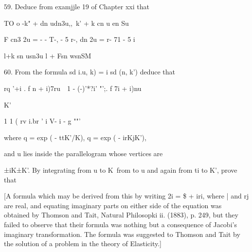 
59. Deduce from examjjle 19 of Chapter xxi that

TO o -k" + dn udn3u,,\ k' + k cn u en Su

F cn3 2u = - - T-, - 5 r-, dn 2u = r- 71 - 5 i~ 

l+k sn usn3u l + Fsn wsnSM


60. From the formula sd i.u, k) = i sd (n, k') deduce that

rq '+i . f n + i)7ru\ \ 1 - (-)'*?i' "';. f 7i + i)nu

K'

1 1 ( rv i.br ' i V- i - g ""'

where q = exp ( - ttK'/K), q = exp ( - irKjK'),

and u lies inside the parallelogram whose vertices are

±iK±K'. By integrating from u to K\ from to u and again from ti to K',
prove that

[A formula which may be derived from this by writing 2i = \$ + iri,
where | and rj are real, and equating imaginary parts on either side
of the equation was obtained by Thomson and Tait, Natural Philosopki
ii. (1883), p. 249, but they failed to observe that their formula was
nothing but a consequence of Jacobi's imaginary transformation. The
formula was suggested to Thomson and Tait by the solution of a problem
in the theory of Elasticity.]

